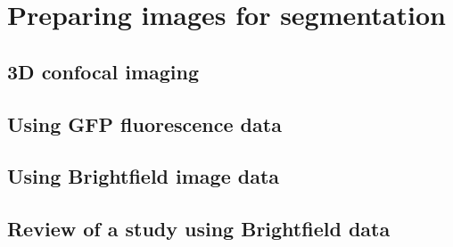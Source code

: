 
\chapter{Preparing images for segmentation}

\ifpdf
    \graphicspath{{Chapter3/Figs/Raster/}{Chapter3/Figs/PDF/}{Chapter3/Figs/}}
\else
    \graphicspath{{Chapter3/Figs/Vector/}{Chapter3/Figs/}}
\fi

\section{3D confocal imaging}


\section{Using GFP fluorescence data}


\section{Using Brightfield image data}


\section{Review of a study using Brightfield data}
